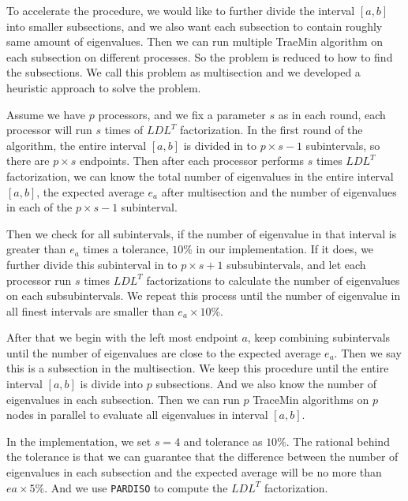To accelerate the procedure, we would like to further divide the interval $[a,b]$ into smaller subsections, and we also want each subsection to contain roughly same amount of eigenvalues. Then we can run multiple TraeMin algorithm on each subsection on different processes. So the problem is reduced to how to find the subsections. We call this problem as multisection and we developed a heuristic approach to solve the problem.

Assume we have $p$ processors, and we fix a parameter $s$ as in each round, each processor will run $s$ times of $LDL^T$ factorization. In the first round of the algorithm, the entire interval $[a, b]$ is divided in to $p \times s - 1$ subintervals, so there are $p \times s$ endpoints. Then after each processor performs $s$ times $LDL^T$ factorization, we can know the total number of eigenvalues in the entire interval $[a,b]$, the expected average $e_a$ after multisection and the number of eigenvalues in each of the $p \times s-1$ subinterval.

Then we check for all subintervals, if the number of eigenvalue in that interval is greater than $e_a$ times a tolerance, $10\%$ in our implementation. If it does, we further divide this subinterval in to $p \times s+1$ subsubintervals, and let each processor run $s$ times $LDL^T$ factorizations to calculate the number of eigenvalues on each subsubintervals. We repeat this process until the number of eigenvalue in all finest intervals are smaller than $e_a \times 10\%$. 

After that we begin with the left most endpoint $a$, keep combining subintervals until the number of eigenvalues are close to the expected average $e_a$. Then we say this is a subsection in the multisection. We keep this procedure until the entire interval $[a,b]$ is divide into $p$ subsections. And we also know the number of eigenvalues in each subsection. Then we can run $p$ TraceMin algorithms on $p$ nodes in parallel to evaluate all eigenvalues in interval $[a,b]$.

In the implementation, we set $s = 4$ and tolerance as $10\%$. The rational behind the tolerance is that we can guarantee that the difference between the number of eigenvalues in each subsection and the expected average will be no more than $ea \times 5\%$. And we use {\tt PARDISO} to compute the $LDL^T$ factorization.



